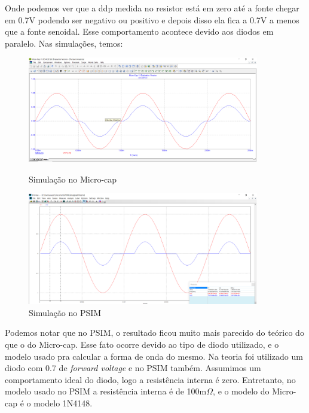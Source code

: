     Onde podemos ver que a ddp medida no resistor está em zero até a fonte chegar em 0.7V podendo ser negativo ou positivo e depois disso ela fica a 0.7V a menos que a fonte senoidal. Esse comportamento acontece devido aos diodos em paralelo. Nas simulações, temos:
    
\begin{figure}[!htb]
    \begin{minipage}{0.5\textwidth}
    \centering
    \includegraphics[width = 0.9\textwidth]{Relatorio1_microcap_Diodo.png}
    \caption{Simulação no Micro-cap\cite{microcap}}
    \end{minipage}\hfill
    \begin{minipage}{0.5\textwidth}
    \centering
    \includegraphics[width = 0.9\textwidth]{Relatorio1_PSIM_Diodo.png}
    \caption{Simulação no PSIM\cite{psim}}
    \end{minipage}\hfill
\end{figure}

  Podemos notar que no PSIM, o resultado ficou muito mais parecido do teórico do que o do Micro-cap. Esse fato ocorre devido ao tipo de diodo utilizado, e o modelo usado pra calcular a forma de onda do mesmo. Na teoria foi utilizado um diodo com 0.7 de \textit{forward voltage} e no PSIM também. Assumimos um comportamento ideal do diodo, logo a resistência interna é zero. Entretanto, no modelo usado no PSIM a resistência interna é de 100m$\Omega$, e o modelo do Micro-cap é o modelo 1N4148.
  
